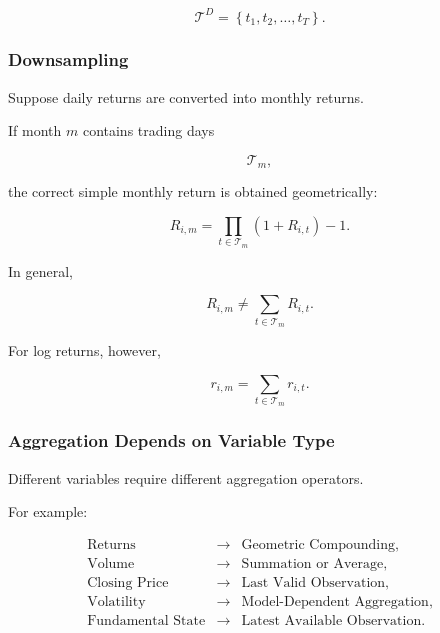 \documentclass[11pt,a4paper]{article}
\begin{document}
\begin{equation}
\mathcal{T}^{D}
=
\left\{
t_1,t_2,\ldots,t_T
\right\}.
\end{equation}


\subsubsection{Downsampling}

Suppose daily returns are converted into monthly returns.

If month $m$ contains trading days

\begin{equation}
\mathcal{T}_m,
\end{equation}

the correct simple monthly return is obtained geometrically:

\begin{equation}
\boxed{
R_{i,m}
=
\prod_{t\in\mathcal{T}_m}
(1+R_{i,t})
-1.
}
\end{equation}

In general,

\begin{equation}
R_{i,m}
\neq
\sum_{t\in\mathcal{T}_m}
R_{i,t}.
\end{equation}

For log returns, however,

\begin{equation}
r_{i,m}
=
\sum_{t\in\mathcal{T}_m}
r_{i,t}.
\end{equation}


\subsubsection{Aggregation Depends on Variable Type}

Different variables require different aggregation operators.

For example:

\begin{equation}
\boxed{
\begin{array}{lll}
\text{Returns}
&
\rightarrow
&
\text{Geometric Compounding},
\\
\text{Volume}
&
\rightarrow
&
\text{Summation or Average},
\\
\text{Closing Price}
&
\rightarrow
&
\text{Last Valid Observation},
\\
\text{Volatility}
&
\rightarrow
&
\text{Model-Dependent Aggregation},
\\
\text{Fundamental State}
&
\rightarrow
&
\text{Latest Available Observation}.
\end{array}
}
\end{equation}
\end{document}
